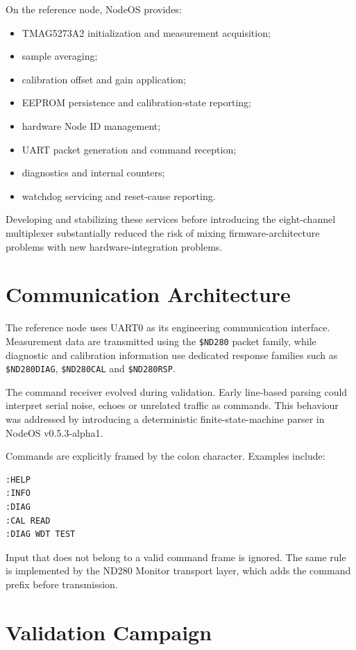 On the reference node, NodeOS provides:
\begin{itemize}[leftmargin=*]
  \item TMAG5273A2 initialization and measurement acquisition;
  \item sample averaging;
  \item calibration offset and gain application;
  \item EEPROM persistence and calibration-state reporting;
  \item hardware Node ID management;
  \item UART packet generation and command reception;
  \item diagnostics and internal counters;
  \item watchdog servicing and reset-cause reporting.
\end{itemize}

Developing and stabilizing these services before introducing the eight-channel multiplexer substantially reduced the risk of mixing firmware-architecture problems with new hardware-integration problems.

\section{Communication Architecture}

The reference node uses UART0 as its engineering communication interface. Measurement data are transmitted using the \texttt{\$ND280} packet family, while diagnostic and calibration information use dedicated response families such as \texttt{\$ND280DIAG}, \texttt{\$ND280CAL} and \texttt{\$ND280RSP}.

The command receiver evolved during validation. Early line-based parsing could interpret serial noise, echoes or unrelated traffic as commands. This behaviour was addressed by introducing a deterministic finite-state-machine parser in NodeOS v0.5.3-alpha1.

Commands are explicitly framed by the colon character. Examples include:
\begin{verbatim}
:HELP
:INFO
:DIAG
:CAL READ
:DIAG WDT TEST
\end{verbatim}

Input that does not belong to a valid command frame is ignored. The same rule is implemented by the ND280 Monitor transport layer, which adds the command prefix before transmission.

\section{Validation Campaign}


